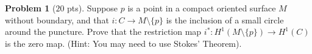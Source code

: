 \documentclass{amsart}
\newcommand{\+}[1]{\ensuremath{\mathbf{#1}}}
\theoremstyle{definition}
\newtheorem{prob}{Problem}
\begin{document}
\begin{prob}[$20$ pts]
 Suppose $p$ is a point in a compact oriented surface $M$ without boundary, and
 that $i: C \to M \setminus \{p\}$ is the inclusion of a small circle around the puncture.
 Prove that the restriction map $i^* : H^1(M \setminus \{p\}) \to H^1(C)$ is the zero map. (Hint: You may need to use Stokes' Theorem).
\end{prob}


\end{document}
